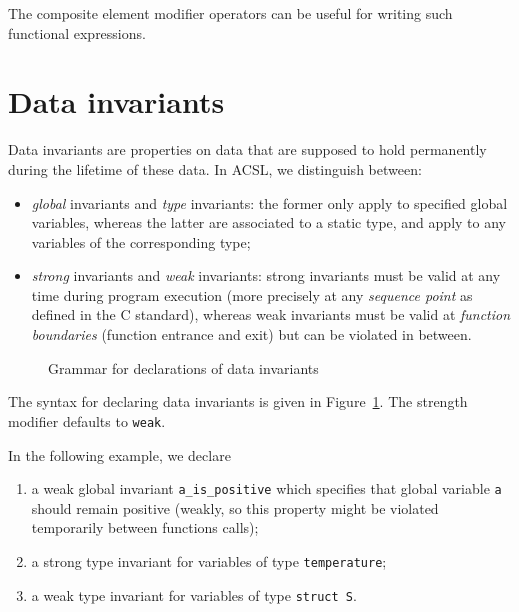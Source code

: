 \begin{example}
  The composite element modifier operators 
  can be useful for writing such functional expressions.
\end{example}

\section{Data invariants}
\label{sec:invariants}
Data invariants are properties on data that are supposed to hold
permanently during the lifetime of these data. In ACSL, we distinguish
between:
\begin{itemize}
\item \emph{global} invariants and \emph{type} invariants: the former
  only apply to specified global variables, whereas the latter are
  associated to a static type, and apply to any variables of
  the corresponding type;
\item \emph{strong} invariants and \emph{weak} invariants:
  strong
  invariants must be valid at any time during program execution
  (more precisely at any \emph{sequence point} as defined in the C
  standard), whereas weak invariants must be valid at \emph{function
    boundaries} (function entrance and exit) but can be violated in
  between.
\end{itemize}

\begin{figure}[t]
  \begin{cadre}
      
    \end{cadre}
  \caption{Grammar for declarations of data invariants}
\label{fig:gram:datainvariants}
\end{figure}

The syntax for declaring data invariants is given in
Figure~\ref{fig:gram:datainvariants}. The strength modifier defaults
to \texttt{weak}.


\begin{example}
  In the following example, we declare
  \begin{enumerate}
  \item a weak global invariant \lstinline|a_is_positive| which specifies that
    global variable \lstinline|a| should remain positive (weakly, so
    this property might be violated temporarily between functions
    calls);
  \item a strong type invariant for variables of type \lstinline|temperature|;
  \item a weak type invariant for variables of type \lstinline|struct S|.
  \end{enumerate}
\end{example}


